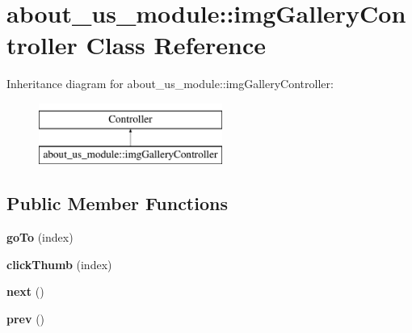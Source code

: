 \hypertarget{classabout__us__module_1_1imgGalleryController}{\section{about\-\_\-us\-\_\-module\-:\-:img\-Gallery\-Controller Class Reference}
\label{classabout__us__module_1_1imgGalleryController}
}
Inheritance diagram for about\-\_\-us\-\_\-module\-:\-:img\-Gallery\-Controller\-:\begin{figure}[H]
\begin{center}
\leavevmode
\includegraphics[height=2.000000cm]{classabout__us__module_1_1imgGalleryController}
\end{center}
\end{figure}
\subsection*{Public Member Functions}
\begin{DoxyCompactItemize}
\item 
\hypertarget{classabout__us__module_1_1imgGalleryController_a76177ef60341ea216545e3a0cbb01f18}{{\bfseries go\-To} (index)}\label{classabout__us__module_1_1imgGalleryController_a76177ef60341ea216545e3a0cbb01f18}

\item 
\hypertarget{classabout__us__module_1_1imgGalleryController_a057f6cc2df7e2e59c0dbe09dbf272ba7}{{\bfseries click\-Thumb} (index)}\label{classabout__us__module_1_1imgGalleryController_a057f6cc2df7e2e59c0dbe09dbf272ba7}

\item 
\hypertarget{classabout__us__module_1_1imgGalleryController_acdedbf295d011139daf7a9fd6aa7b590}{{\bfseries next} ()}\label{classabout__us__module_1_1imgGalleryController_acdedbf295d011139daf7a9fd6aa7b590}

\item 
\hypertarget{classabout__us__module_1_1imgGalleryController_aea88dd40e7708df4c3d85a5508f6b5bb}{{\bfseries prev} ()}\label{classabout__us__module_1_1imgGalleryController_aea88dd40e7708df4c3d85a5508f6b5bb}

\end{DoxyCompactItemize}
